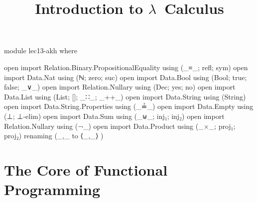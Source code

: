 \documentclass{lecturenotes}
\title{Introduction to $\lambda$~Calculus}
\begin{document}
\maketitle

\begin{code}[hide]
module lec13-akh where

open import Relation.Binary.PropositionalEquality  using (_≡_; refl; sym)
open import Data.Nat using (ℕ; zero; suc)
open import Data.Bool using (Bool; true; false; _∨_)
open import Relation.Nullary using (Dec; yes; no)
open import Data.List using (List; []; _∷_; _++_)
open import Data.String using (String)
open import Data.String.Properties using (_≟_)
open import Data.Empty using (⊥; ⊥-elim)
open import Data.Sum using (_⊎_; inj₁; inj₂)
open import Relation.Nullary using (¬_)
open import Data.Product using (_×_; proj₁; proj₂) renaming (_,_ to ⟨_,_⟩ )
\end{code}


\section{The Core of Functional Programming}
\label{sec:core-funct-progr}
\end{document}

